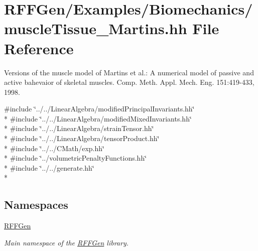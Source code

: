 \hypertarget{muscleTissue__Martins_8hh}{\section{R\-F\-F\-Gen/\-Examples/\-Biomechanics/muscle\-Tissue\-\_\-\-Martins.hh File Reference}
\label{muscleTissue__Martins_8hh}
}


Versions of the muscle model of Martins et al.\-: A numerical model of passive and active bahevaior of skeletal muscles. Comp. Meth. Appl. Mech. Eng. 151\-:419-\/433, 1998.  


{\ttfamily \#include \char`\"{}../../\-Linear\-Algebra/modified\-Principal\-Invariants.\-hh\char`\"{}}\\*
{\ttfamily \#include \char`\"{}../../\-Linear\-Algebra/modified\-Mixed\-Invariants.\-hh\char`\"{}}\\*
{\ttfamily \#include \char`\"{}../../\-Linear\-Algebra/strain\-Tensor.\-hh\char`\"{}}\\*
{\ttfamily \#include \char`\"{}../../\-Linear\-Algebra/tensor\-Product.\-hh\char`\"{}}\\*
{\ttfamily \#include \char`\"{}../../\-C\-Math/exp.\-hh\char`\"{}}\\*
{\ttfamily \#include \char`\"{}../volumetric\-Penalty\-Functions.\-hh\char`\"{}}\\*
{\ttfamily \#include \char`\"{}../../generate.\-hh\char`\"{}}\\*
\subsection*{Namespaces}
\begin{DoxyCompactItemize}
\item 
\hyperlink{namespaceRFFGen}{R\-F\-F\-Gen}
\begin{DoxyCompactList}\small\item\em Main namespace of the \hyperlink{namespaceRFFGen}{R\-F\-F\-Gen} library. \end{DoxyCompactList}\end{DoxyCompactItemize}

